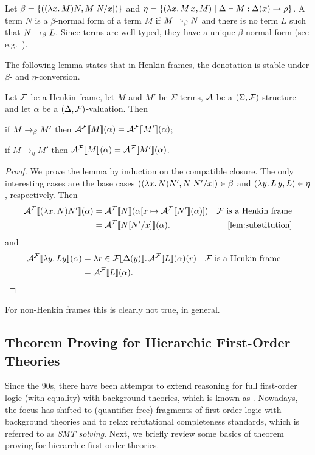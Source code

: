 \documentclass[a4paper,twoside,notitlepage,openright,11pt]{report}
\begin{document}
Let $\beta=\{((\lambda x\ldotp M)N,M[N/x])\}$ and $\eta=\{(\lambda x\ldotp M\,x,M)\mid \Delta\vdash M:\Delta(x)\to\rho\}$. %
A term $N$ is a $\beta$-normal form of a term $M$ if $M\twoheadrightarrow_\beta N$ and there is no term $L$ such that $N\rightarrow_\beta L$. Since terms are well-typed, they have a unique $\beta$-normal form (see e.g.\ \cite{Girard89,B12}).

The following lemma states that in Henkin frames, the denotation is stable under $\beta$- and $\eta$-conversion.

\begin{lemma}
  Let $\mathcal F$ be a Henkin frame, let $M$ and $M'$ be $\Sigma$-terms, $\mathcal A$ be a $(\Sigma,\mathcal F)$-structure and let $\alpha$ be a $(\Delta,\mathcal F)$-valuation. Then
  \begin{thmlist}
  \item\label{lem:betapreserve} if $M\rightarrow_\beta M'$ then ${\mathcal A}^\mathcal F\llbracket M\rrbracket(\alpha)={\mathcal A}^\mathcal F\llbracket M'\rrbracket(\alpha)$;
  \item\label{lem:etaequal} if $M\rightarrow_\eta M'$ then ${\mathcal A}^\mathcal F\llbracket M\rrbracket(\alpha)={\mathcal A}^\mathcal F\llbracket M'\rrbracket(\alpha)$.
  \end{thmlist}
\end{lemma}
\begin{proof}
  We prove the lemma by induction on the compatible closure. The only interesting cases are the base cases $((\lambda x\ldotp N)N',N[N'/x])\in\beta$ and $(\lambda y\ldotp L\,y,L)\in\eta$, respectively. Then
  \begin{align*}
    \hinti\As{(\lambda x\ldotp N)N'}(\alpha)&=\hinti\As{N}(\alpha[x\mapsto\hinti\As{N'}(\alpha)])&\Hf\text{ is a Henkin frame}\\
                                    &=\hinti\As{N[N'/x]}(\alpha).&\text{\cref{lem:substitution}}
  \end{align*}
  and
  \begin{align*}
    {\mathcal A}^\mathcal F\llbracket\lambda y\ldotp Ly\rrbracket(\alpha)&=\lambda r\in{\mathcal F}\llbracket\Delta(y)\rrbracket\ldotp{\mathcal A}^\mathcal F\llbracket L\rrbracket(\alpha)(r)&\mathcal F\text{ is a Henkin frame}\\
                                  &={\mathcal A}^\mathcal F\llbracket L\rrbracket(\alpha).&&\qedhere
  \end{align*}
\end{proof}
For non-Henkin frames this is clearly not true, in general.



\subsection{Theorem Proving for Hierarchic First-Order Theories}
\label{subsec:hierfol}
Since the 90s, there have been attempts to extend reasoning for full first-order logic (with equality) with background theories, which is known as . Nowadays, the focus has shifted to (quantifier-free) fragments of first-order logic with background theories and to relax refutational completeness standards, which is referred to as \emph{SMT solving}.
Next, we briefly review some basics of theorem proving for hierarchic first-order theories.
\end{document}
